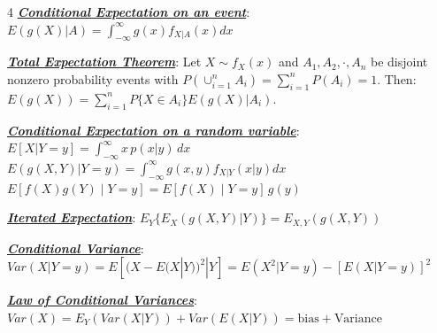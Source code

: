 \documentclass[12pt]{article}
\newcommand{\bulletPoint}[1]{\ul{\textit{\textbf{#1}}}}
\begin{document}
\begin{multicols*}{4}
\bulletPoint{Conditional Expectation on an event}: $E(g(X)|A) = \int^\infty_{-\infty}g(x)f_{X|A}(x)dx$


\bulletPoint{Total Expectation Theorem}: Let $X \sim f_X(x)$ and $A_1, A_2, \cdot, A_n$ be disjoint nonzero probability events with $P(\cup^n_{i=1}A_i) = \sum^n_{i=1}P(A_i)=1$. Then: $E(g(X)) = \sum^n_{i=1}P\{ X \in A_i \} E(g(X)|A_i)$. 


\bulletPoint{Conditional Expectation on a random variable}: 
$E[X|Y=y]=\int_{-\infty}^{\infty}x\,p(x|y)\,dx$
$E(g(X, Y)|Y=y) = \int^\infty_{-\infty}g(x,y)f_{X|Y}(x|y)dx$
$E[f(X)g(Y)\mid Y=y]=E[f(X)\mid Y=y]\,g(y)$


\bulletPoint{Iterated Expectation}: $E_Y\{ E_X(g(X,Y)|Y)\} = E_{X,Y}(g(X, Y))$


\bulletPoint{Conditional Variance}: $Var(X|Y=y) = E[(X-E(X|Y))^2|Y] = E(X^2|Y=y) - [E(X|Y=y)]^2$


\bulletPoint{Law of Conditional Variances}: $Var(X) = E_Y(Var(X|Y)) + Var(E(X|Y)) = \text{bias} + \text{Variance}$



\end{multicols*}
\end{document}
